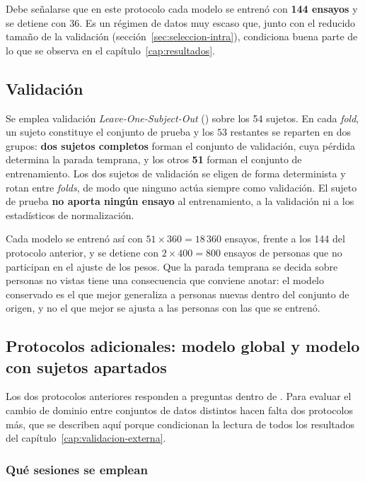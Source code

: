Debe señalarse que en este protocolo cada modelo se entrenó con
\textbf{144 ensayos} y se detiene con 36. Es un régimen de datos muy escaso que, junto
con el reducido tamaño de la validación (sección~\ref{sec:seleccion-intra}), condiciona
buena parte de lo que se observa en el capítulo~\ref{cap:resultados}.

\subsection{Validación \loso{}}

Se emplea validación \textit{Leave-One-Subject-Out} (\loso{}) sobre los 54 sujetos. En cada
\textit{fold}, un sujeto constituye el conjunto de prueba y los $53$ restantes se reparten
en dos grupos: \textbf{dos sujetos completos} forman el conjunto de validación, cuya pérdida
determina la parada temprana, y los otros \textbf{51} forman el conjunto de entrenamiento. Los
dos sujetos de validación se eligen de forma determinista y rotan entre \textit{folds}, de
modo que ninguno actúa siempre como validación. El sujeto de prueba \textbf{no aporta ningún
ensayo} al entrenamiento, a la validación ni a los estadísticos de normalización.

Cada modelo se entrenó así con $51 \times 360 = 18\,360$ ensayos, frente a los 144 del
protocolo anterior, y se detiene con $2 \times 400 = 800$ ensayos de personas que no
participan en el ajuste de los pesos. Que la parada temprana se decida sobre personas no
vistas tiene una consecuencia que conviene anotar: el modelo conservado es el que mejor
generaliza a personas nuevas dentro del conjunto de origen, y no el que mejor se ajusta a
las personas con las que se entrenó.

\subsection{Protocolos adicionales: modelo global y modelo con sujetos apartados}
\label{sec:protocolos-extra}

Los dos protocolos anteriores responden a preguntas dentro de \openbmi{}. Para evaluar el
cambio de dominio entre conjuntos de datos distintos hacen falta dos protocolos más, que se
describen aquí porque condicionan la lectura de todos los resultados del
capítulo~\ref{cap:validacion-externa}.

\subsubsection{Qué sesiones se emplean}

